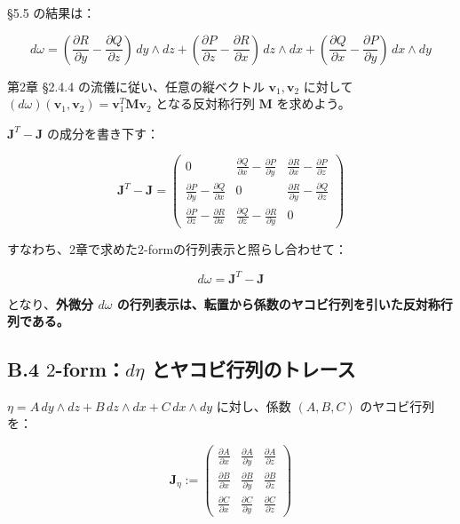 \documentclass[a4paper,12pt,openany]{book}
\begin{document}
§5.5 の結果は：

\[d\omega = (\frac{\partial R}{\partial y} - \frac{\partial Q}{\partial z})\,dy \wedge dz + (\frac{\partial P}{\partial z} - \frac{\partial R}{\partial x})\,dz \wedge dx + (\frac{\partial Q}{\partial x} - \frac{\partial P}{\partial y})\,dx \wedge dy\]

第2章 §2.4.4 の流儀に従い、任意の縦ベクトル
\(\mathbf{v}_1, \mathbf{v}_2\) に対して
\((d\omega)(\mathbf{v}_1, \mathbf{v}_2) = \mathbf{v}_1^T \mathbf{M} \mathbf{v}_2\)
となる反対称行列 \(\mathbf{M}\) を求めよう。

\(\mathbf{J}^T - \mathbf{J}\) の成分を書き下す：

\[\mathbf{J}^T - \mathbf{J} = \begin{pmatrix}
0 & \frac{\partial Q}{\partial x} - \frac{\partial P}{\partial y} & \frac{\partial R}{\partial x} - \frac{\partial P}{\partial z} \\
\frac{\partial P}{\partial y} - \frac{\partial Q}{\partial x} & 0 & \frac{\partial R}{\partial y} - \frac{\partial Q}{\partial z} \\
\frac{\partial P}{\partial z} - \frac{\partial R}{\partial x} & \frac{\partial Q}{\partial z} - \frac{\partial R}{\partial y} & 0
\end{pmatrix}\]

すなわち、2章で求めた\(2\)-formの行列表示と照らし合わせて：

\[d\omega = \mathbf{J}^T - \mathbf{J}\]

となり、\textbf{外微分 $d\omega$ の行列表示は、転置から係数のヤコビ行列を引いた反対称行列である。}

\hypertarget{b.4-2-formdeta-ux3068ux30e4ux30b3ux30d3ux884cux5217ux306eux30c8ux30ecux30fcux30b9}{%
\subsection*{\texorpdfstring{B.4 \(2\)-form：\(d\eta\)
とヤコビ行列のトレース}{B.4 2-form：d\textbackslash eta とヤコビ行列のトレース}}\label{b.4-2-formdeta-ux3068ux30e4ux30b3ux30d3ux884cux5217ux306eux30c8ux30ecux30fcux30b9}}

\(\eta = A\,dy \wedge dz + B\,dz \wedge dx + C\,dx \wedge dy\)
に対し、係数 \((A,B,C)\) のヤコビ行列を：

\[\mathbf{J}_\eta := \begin{pmatrix}
\frac{\partial A}{\partial x} & \frac{\partial A}{\partial y} & \frac{\partial A}{\partial z} \\
\frac{\partial B}{\partial x} & \frac{\partial B}{\partial y} & \frac{\partial B}{\partial z} \\
\frac{\partial C}{\partial x} & \frac{\partial C}{\partial y} & \frac{\partial C}{\partial z}
\end{pmatrix}\]
\end{document}
